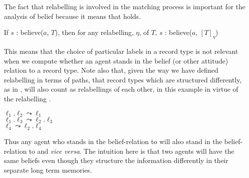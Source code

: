The fact that
relabelling is involved in the matching process is important for the
analysis of belief because
it means that \nexteg{} holds.
\begin{ex} 
If $s$ : believe($a$, $T$), then for any relabelling, $\eta$,
of $T$, $s$ : believe($a$, $[T]_{\eta}$) 
\end{ex} 
This means that the choice of particular labels in a record type is
not relevant when we compute whether an agent stands in the belief (or
other attitude)
relation to a record type.  Note also that, given the way we have
defined relabelling in terms of paths, that record
types which are structured differently, as in , will also
count as relabellings of each other, in this example in virtue of the relabelling .
\begin{ex} 
\begin{subex} 
 
\item {} 
 
\item {}

\item  $\ell_1.\ell_2\leadsto\ell_1$\\
$\ell_1.\ell_3\leadsto\ell_2.\ell_3$\\
$\ell_4\leadsto\ell_2.\ell_4$
 
\end{subex} 
   
\end{ex} 
Thus any agent who stands in the belief-relation to  will
also stand in the belief-relation to  and \textit{vice
  versa}.  The intuition here is that two agents will have the same
beliefs even though they structure the information differently in
their separate long term memories.

